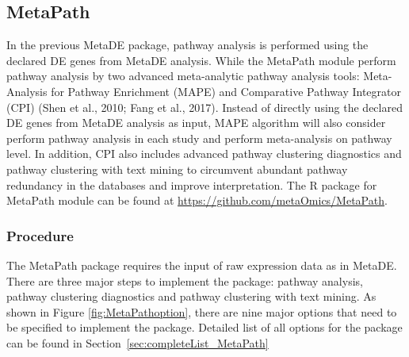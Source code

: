 \subsection{MetaPath}

In the previous MetaDE package,
pathway analysis is performed using the declared DE genes from MetaDE analysis.
While  the MetaPath module  perform pathway analysis by two advanced meta-analytic pathway analysis tools: 
Meta-Analysis for Pathway Enrichment (MAPE) and Comparative Pathway Integrator (CPI) (Shen et al., 2010; Fang et al., 2017). 
Instead of directly using the declared DE genes from MetaDE analysis as input, 
MAPE algorithm will also consider perform pathway analysis in each study and perform meta-analysis on pathway level.
In addition, CPI also includes advanced pathway clustering diagnostics and pathway clustering with text mining to circumvent abundant pathway redundancy in the databases and improve interpretation. 
The R package for MetaPath module can be found at \url{https://github.com/metaOmics/MetaPath}.

\subsubsection{Procedure}
The MetaPath package requires the input of raw expression data as in MetaDE. 
There are three major steps to implement the package: pathway analysis, pathway clustering diagnostics and pathway clustering with text mining. 
As shown in Figure \ref{fig:MetaPathoption}, there are nine major options that need to be specified to implement the package.
Detailed list of all options for the package can be found in Section~\ref{sec:completeList_MetaPath} 


